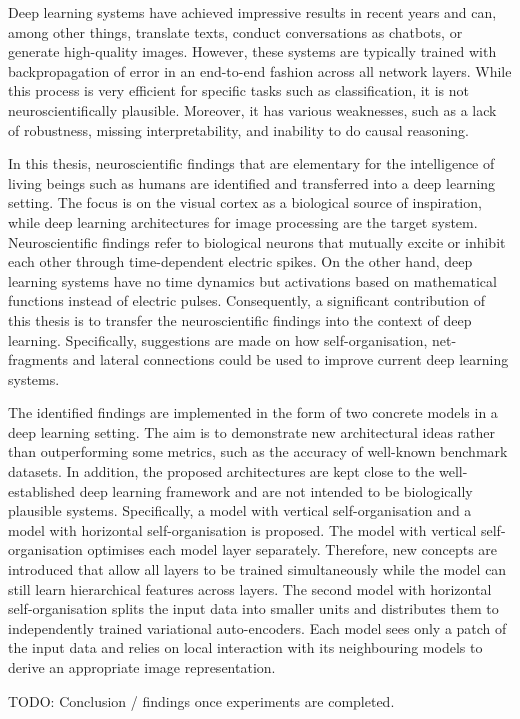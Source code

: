 Deep learning systems have achieved impressive results in recent years and can, among other things, translate texts, conduct conversations as chatbots, or generate high-quality images. However, these systems are typically trained with backpropagation of error in an end-to-end fashion across all network layers. While this process is very efficient for specific tasks such as classification, it is not neuroscientifically plausible. Moreover, it has various weaknesses, such as a lack of robustness, missing interpretability, and inability to do causal reasoning.

In this thesis, neuroscientific findings that are elementary for the intelligence of living beings such as humans are identified and transferred into a deep learning setting. The focus is on the visual cortex as a biological source of inspiration, while deep learning architectures for image processing are the target system. Neuroscientific findings refer to biological neurons that mutually excite or inhibit each other through time-dependent electric spikes. On the other hand, deep learning systems have no time dynamics but activations based on mathematical functions instead of electric pulses. Consequently, a significant contribution of this thesis is to transfer the neuroscientific findings into the context of deep learning. Specifically, suggestions are made on how self-organisation, net-fragments and lateral connections could be used to improve current deep learning systems.

The identified findings are implemented in the form of two concrete models in a deep learning setting. The aim is to demonstrate new architectural ideas rather than outperforming some metrics, such as the accuracy of well-known benchmark datasets. In addition, the proposed architectures are kept close to the well-established deep learning framework and are not intended to be biologically plausible systems. Specifically, a model with vertical self-organisation and a model with horizontal self-organisation is proposed. The model with vertical self-organisation optimises each model layer separately. Therefore, new concepts are introduced that allow all layers to be trained simultaneously while the model can still learn hierarchical features across layers. The second model with horizontal self-organisation splits the input data into smaller units and distributes them to independently trained variational auto-encoders. Each model sees only a patch of the input data and relies on local interaction with its neighbouring models to derive an appropriate image representation.


TODO: Conclusion / findings once experiments are completed.
